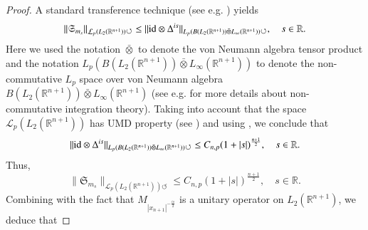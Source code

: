 \documentclass[12pt]{amsart}
\begin{document}
\begin{proof}
{\color{red}A standard transference technique (see e.g.  \cite{MR3378821,MR2866074}) yields
\begin{align*}
\|\mathfrak{S}_{m_s}\|_{\mathcal{L}_p(L_2(\mathbb{R}^{n+1}))\circlearrowleft}\leq \|{\rm id}\otimes \Delta^{is}\|_{L_p(B(L_2(\mathbb{R}^{n+1}))\bar{\otimes}L_{\infty}(\mathbb{R}^{n+1}))\circlearrowleft},\quad s\in\mathbb{R}.
\end{align*}
Here we used the notation $\bar{\otimes}$ to denote the von Neumann algebra tensor product and the notation $L_p(B(L_2(\mathbb{R}^{n+1}))\bar{\otimes}L_{\infty}(\mathbb{R}^{n+1}))$ to denote the non-commutative $L_p$ space over von Neumann algebra $B(L_2(\mathbb{R}^{n+1}))\bar{\otimes}L_{\infty}(\mathbb{R}^{n+1})$ (see e.g. \cite{MR4738490,PX} for more details about non-commutative integration theory). Taking into account that the space $\mathcal{L}_p(L_2(\mathbb{R}^{n+1}))$ has UMD property (see \cite[Proposition 5.4.2]{HNVWbook}) and using \cite[Corollary 5.70]{HNVWbook}, we conclude that
\begin{align*}
\|{\rm id}\otimes \Delta^{is}\|_{L_p(B(L_2(\mathbb{R}^{n+1}))\bar{\otimes}L_{\infty}(\mathbb{R}^{n+1}))\circlearrowleft}\leq C_{n,p}(1+|s|)^{\frac{n+1}{2}},\quad s\in\mathbb{R}.
\end{align*}
Thus,
$$\|\mathfrak{S}_{m_s}\|_{\mathcal{L}_p(L_2(\mathbb{R}^{n+1}))\circlearrowleft}\leq C_{n,p}(1+|s|)^{\frac{n+1}{2}},\quad s\in\mathbb{R}.$$}
Combining with the fact that $M_{|x_{n+1}|^{-\frac{is}{2}}}$ is a unitary operator on $L_2(\mathbb{R}^{n+1})$, we deduce that

\end{proof}
\end{document}
